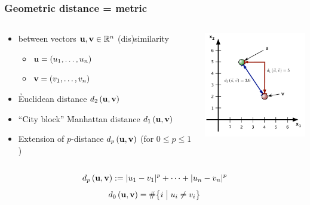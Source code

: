 \documentclass[t]{beamer} %
\begin{document}
\begin{frame}
  \frametitle{Geometric distance = metric}

  \begin{columns}[T]
    \begin{column}{60mm}
      \begin{itemize}
      \item {} between vectors $\vu, \vv \in \setR^n$ \so
        (dis)similarity
        \begin{itemize}
        \item $\vu = (u_1, \ldots, u_n)$
        \item $\vv = (v_1, \ldots, v_n)$
        \end{itemize}
      \item \h{Euclidean} distance $\dist[2]{\vu}{\vv}$
      \item ``City block'' \h{Manhattan} distance $\dist[1]{\vu}{\vv}$
      \item Extension of $p$-distance  $\dist[p]{\vu}{\vv}$ (for $0\leq p\leq 1$)
      \end{itemize}
    \end{column}
    \begin{column}{45mm}
      \includegraphics[width=45mm]{img/7_distance_examples}
    \end{column}
  \end{columns}
  \gap[1.5]
  \[ \dist[p]{\vu}{\vv} \coloneq \abs{u_1 - v_1}^p + \dots + \abs{u_n - v_n}^p \]
  \[ \dist[0]{\vu}{\vv} = \# \bigsetdef{i}{u_i \neq v_i} \]
\end{frame}
\end{document}
